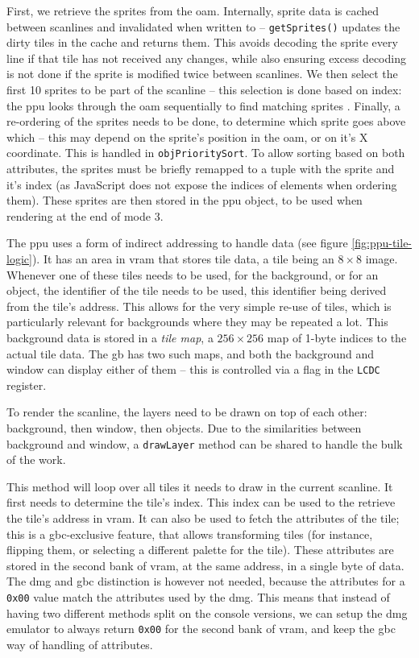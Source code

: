 \documentclass[11pt]{informatics-report}
\begin{document}
First, we retrieve the sprites from the \gls{oam}. Internally, sprite data is cached between scanlines and invalidated when written to -- \texttt{getSprites()} updates the dirty tiles in the cache and returns them. This avoids decoding the sprite every line if that tile has not received any changes, while also ensuring excess decoding is not done if the sprite is modified twice between scanlines. We then select the first 10 sprites to be part of the scanline -- this selection is done based on index: the \gls{ppu} looks through the \gls{oam} sequentially to find matching sprites \cite[OAM]{pandoc}. Finally, a re-ordering of the sprites needs to be done, to determine which sprite goes above which -- this may depend on the sprite's position in the \gls{oam}, or on it's X coordinate. This is handled in \texttt{objPrioritySort}. To allow sorting based on both attributes, the sprites must be briefly remapped to a tuple with the sprite and it's index (as JavaScript does not expose the indices of elements when ordering them). These sprites are then stored in the \gls{ppu} object, to be used when rendering at the end of mode 3.

The \gls{ppu} uses a form of indirect addressing to handle data (see figure \ref{fig:ppu-tile-logic}). It has an area in \gls{vram} that stores tile data, a tile being an $8 \times 8$ image. Whenever one of these tiles needs to be used, for the background, or for an object, the identifier of the tile needs to be used, this identifier being derived from the tile's address. This allows for the very simple re-use of tiles, which is particularly relevant for backgrounds where they may be repeated a lot. This background data is stored in a \textit{tile map}, a $256 \times 256$ map of 1-byte indices to the actual tile data. The \gls{gb} has two such maps, and both the background and window can display either of them -- this is controlled via a flag in the \texttt{LCDC} register.

To render the scanline, the layers need to be drawn on top of each other: background, then window, then objects. Due to the similarities between background and window, a \texttt{drawLayer} method can be shared to handle the bulk of the work.

This method will loop over all tiles it needs to draw in the current scanline. It first needs to determine the tile's index. This index can be used to the retrieve the tile's address in \gls{vram}. It can also be used to fetch the attributes of the tile; this is a \gls{gbc}-exclusive feature, that allows transforming tiles (for instance, flipping them, or selecting a different palette for the tile). These attributes are stored in the second bank of \gls{vram}, at the same address, in a single byte of data. The \gls{dmg} and \gls{gbc} distinction is however not needed, because the attributes for a \texttt{0x00} value match the attributes used by the \gls{dmg}. This means that instead of having two different methods split on the console versions, we can setup the \gls{dmg} emulator to always return \texttt{0x00} for the second bank of \gls{vram}, and keep the \gls{gbc} way of handling of attributes.
\end{document}
